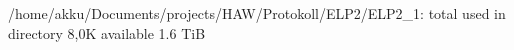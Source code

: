   /home/akku/Documents/projects/HAW/Protokoll/ELP2/ELP2_1:
  total used in directory 8,0K available 1.6 TiB
